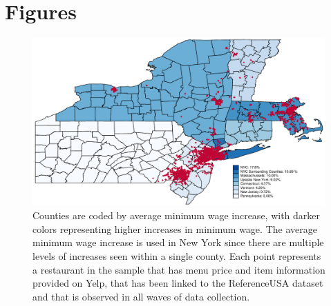 \documentclass[11pt]{article}
\begin{document}
\newpage


%


\newpage


\section{Figures}

\begin{figure}[H]
\centering
\includegraphics[scale=.75]{map_yelp.pdf}
\caption[Short Heading]{
Counties are coded by average minimum wage increase, with darker colors representing higher increases in minimum wage. The average minimum wage increase is used in New York since there are multiple levels of increases seen within a single county. Each point represents a restaurant in the sample that has menu price and item information provided on Yelp, that has been linked to the ReferenceUSA dataset and that is observed in all waves of data collection.
}
\end{figure}
\end{document}
